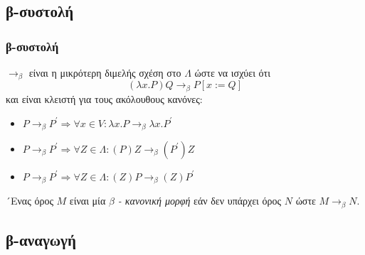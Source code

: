 \documentclass{beamer}
\begin{document}
\subsection{β-συστολή}

\begin{frame}
  \frametitle{β-συστολή}
  $\rightarrow _\beta$ είναι η μικρότερη διμελής σχέση στο $\Lambda$
  ώστε να ισχύει ότι $$(\lambda x . P)Q \rightarrow _\beta P[x:=Q]$$
  και είναι κλειστή για τους ακόλουθους κανόνες:
  \begin{itemize}
  \item $P \rightarrow _\beta P^{\prime} \Rightarrow \forall x \in V
    : \lambda x . P \rightarrow _\beta \lambda x .  P^{\prime}$
  \item $P \rightarrow _\beta P^{\prime} \Rightarrow \forall Z \in
    \Lambda : (P)Z \rightarrow _\beta (P^{\prime})Z$
  \item $P \rightarrow _\beta P^{\prime} \Rightarrow \forall Z \in
    \Lambda : (Z)P \rightarrow _\beta (Z)P^{\prime}$
  \end{itemize} \pause
  	\[ \]
  	´Ενας όρος $M$ είναι μία \textit{$\beta$ - κανονική μορφή} εάν
    δεν υπάρχει όρος $N$ ώστε $M \rightarrow _\beta N$.
\end{frame}

\subsection{β-αναγωγή}

\end{document}
